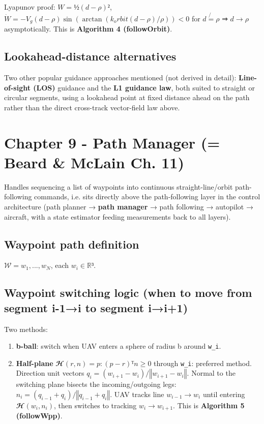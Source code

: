 \documentclass[11pt]{article}
\begin{document}
Lyapunov proof: $W = ½(d-ρ)²$, $\dot{W} = -V_g(d-ρ) \sin(\arctan(k_orbit(d-ρ)/ρ)) < 0$ for $d\not{=}ρ$ ⇒ $d→ρ$ asymptotically. This is \textbf{Algorithm 4 (followOrbit)}.

\subsection{Lookahead-distance alternatives}
Two other popular guidance approaches mentioned (not derived in detail): \textbf{Line-of-sight (LOS)} guidance and the \textbf{L1 guidance law}, both suited to straight or circular segments, using a lookahead point at fixed distance ahead on the path rather than the direct cross-track vector-field law above.

\section{Chapter 9 - Path Manager (= Beard \& McLain Ch. 11)}

Handles sequencing a list of waypoints into continuous straight-line/orbit path-following commands, i.e. sits directly above the path-following layer in the control architecture (path planner → \textbf{path manager} → path following → autopilot → aircraft, with a state estimator feeding measurements back to all layers).

\subsection{Waypoint path definition}
$𝒲 = {w_1,...,w_N}$, each $w_i ∈ ℝ³$.

\subsection{Waypoint switching logic (when to move from segment i-1→i to segment i→i+1)}
Two methods:
\begin{enumerate}
\item \textbf{b-ball}: switch when UAV enters a sphere of radius b around \texttt{w\_\allowbreak{}i}.
\item \textbf{Half-plane} $𝓗(r,n) = {p : (p-r)ᵀn ≥ 0}$ through \texttt{w\_\allowbreak{}i}: preferred method. Direction unit vectors $q_i = (w_{i+1}-w_i)/‖w_{i+1}-w_i‖$. Normal to the switching plane bisects the incoming/outgoing legs: $n_i = (q_{i-1}+q_i)/‖q_{i-1}+q_i‖$. UAV tracks line $w_{i-1}→w_i$ until entering $𝓗(w_i,n_i)$, then switches to tracking $w_i→w_{i+1}$. This is \textbf{Algorithm 5 (followWpp)}.
\end{enumerate}
\end{document}
